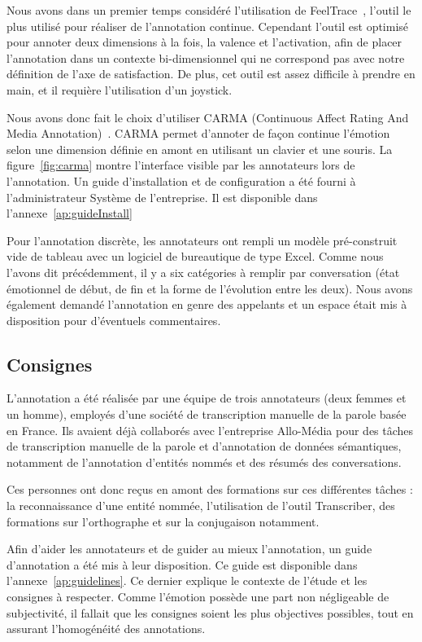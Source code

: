 Nous avons dans un premier temps considéré l'utilisation de FeelTrace~\cite{Cowie2000}, l'outil le plus utilisé pour réaliser de l'annotation continue. Cependant l’outil est optimisé pour annoter deux dimensions à la fois, la valence et l'activation, afin de placer l'annotation dans un contexte bi-dimensionnel qui ne correspond pas avec notre définition de l'axe de satisfaction. De plus, cet outil est assez difficile à prendre en main, et il requière l'utilisation d'un joystick.

Nous avons donc fait le choix d’utiliser CARMA (Continuous Affect Rating And Media Annotation)~\cite{Girard2014}. CARMA permet d'annoter de façon continue l'émotion selon une dimension définie en amont en utilisant un clavier et une souris. La figure~\ref{fig:carma} montre l'interface visible par les annotateurs lors de l'annotation. Un guide d'installation et de configuration a été fourni à l'administrateur Système de l'entreprise. Il est disponible dans l'annexe~\ref{ap:guideInstall}



Pour l'annotation discrète, les annotateurs ont rempli un modèle pré-construit vide de tableau avec un logiciel de bureautique de type Excel. Comme nous l'avons dit précédemment, il y a six catégories à remplir par conversation (état émotionnel de début, de fin et la forme de l'évolution entre les deux). Nous avons également demandé l'annotation en genre des appelants et un espace était mis à disposition pour d'éventuels commentaires.

\subsection{Consignes}

L'annotation a été réalisée par une équipe de trois annotateurs (deux femmes et un homme), employés d'une société de transcription manuelle de la parole basée en France. Ils avaient déjà collaborés avec l'entreprise Allo-Média pour des tâches de transcription manuelle de la parole et d'annotation de données sémantiques, notamment de l'annotation d'entités nommés et des résumés des conversations.

Ces personnes ont donc reçus en amont des formations sur ces différentes tâches : la reconnaissance d'une entité nommée, l'utilisation de l’outil Transcriber, des formations sur l’orthographe et sur la conjugaison notamment.

Afin d'aider les annotateurs et de guider au mieux l'annotation, un guide d'annotation a été mis à leur disposition. Ce guide est disponible dans l'annexe~\ref{ap:guidelines}. Ce dernier explique le contexte de l'étude et les consignes à respecter. Comme l'émotion possède une part non négligeable de subjectivité, il fallait que les consignes soient les plus objectives possibles, tout en assurant l'homogénéité des annotations.

